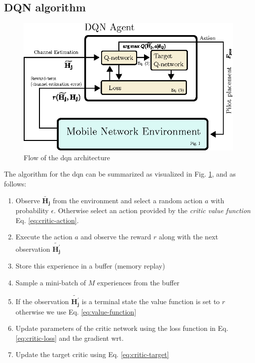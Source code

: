\subsection{DQN algorithm}\label{subsec:dqn_algorithm}
\begin{figure}
    \centering
    \includegraphics[width=\textwidth]{chapters/part_uplink/figures/RL_dqn_architecture_simplified.eps}
    \caption{Flow of the \gls{dqn} architecture}
    \label{fig:dqn_architecture_simplified}
\end{figure}

The algorithm for the \gls{dqn} can be summarized as visualized in Fig. \ref{fig:dqn_architecture_simplified}, and as follows: 


\begin{enumerate}
    \item Observe $\mathbf{\widetilde{H_j}}$ from the environment and select a random action $a$ with probability $\epsilon$. Otherwise select an action provided by the \emph{critic value function} Eq. \ref{eq:critic-action}.
    \item Execute the action $a$ and observe the reward $r$ along with the next observation $\mathbf{\widetilde{H_j^{'}}}$
    \item Store this experience in a buffer (memory replay)
    \item Sample a mini-batch of $M$ experiences from the buffer
    \item If the observation $\mathbf{\widetilde{H_j^{'}}}$ is a terminal state the value function is set to $r$ otherwise we use Eq. \ref{eq:value-function}
    \item Update parameters of the critic network using the loss function in Eq. \ref{eq:critic-loss} and the gradient wrt. 
    \item Update the target critic using Eq. \ref{eq:critic-target}
\end{enumerate}


